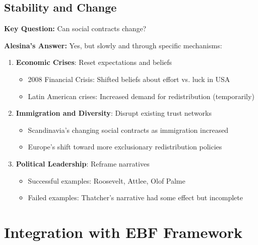 \subsection{Stability and Change}

\textbf{Key Question:} Can social contracts change?

\textbf{Alesina's Answer:} Yes, but slowly and through specific mechanisms:

\begin{enumerate}
\item \textbf{Economic Crises}: Reset expectations and beliefs
   \begin{itemize}
   \item 2008 Financial Crisis: Shifted beliefs about effort vs. luck in USA
   \item Latin American crises: Increased demand for redistribution (temporarily)
   \end{itemize}

\item \textbf{Immigration and Diversity}: Disrupt existing trust networks
   \begin{itemize}
   \item Scandinavia's changing social contracts as immigration increased
   \item Europe's shift toward more exclusionary redistribution policies
   \end{itemize}

\item \textbf{Political Leadership}: Reframe narratives
   \begin{itemize}
   \item Successful examples: Roosevelt, Attlee, Olof Palme
   \item Failed examples: Thatcher's narrative had some effect but incomplete
   \end{itemize}

\end{enumerate}

\clearpage


\section{Integration with EBF Framework}
\label{sec:alesina-ebf-integration}

